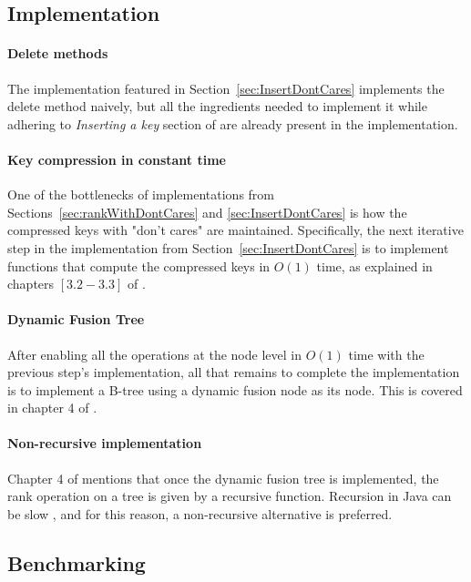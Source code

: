 \subsection{Implementation} \label{sec:FutureWorkImplementation}

\paragraph*{Delete methods}
The implementation featured in Section~\ref{sec:InsertDontCares} implements the {\ttfamily delete} method naively, but all the ingredients needed to implement it while adhering to \textit{Inserting a key} section of \cite{patrascu2014dynamic} are already present in the implementation.

\paragraph*{Key compression in constant time}
One of the bottlenecks of implementations from Sections~\ref{sec:rankWithDontCares} and \ref{sec:InsertDontCares} is how the compressed keys with "don't cares" are maintained. Specifically, the next iterative step in the implementation from Section~\ref{sec:InsertDontCares} is to implement functions that compute the compressed keys in $O(1)$ time, as explained in chapters $[3.2 - 3.3]$ of \cite{patrascu2014dynamic}.

\paragraph*{Dynamic Fusion Tree}
After enabling all the operations at the node level in $O(1)$ time with the previous step's implementation, all that remains to complete the implementation is to implement a B-tree using a dynamic fusion node as its node. This is covered in chapter 4 of \cite{patrascu2014dynamic}.

\paragraph*{Non-recursive implementation}
Chapter 4 of \cite{patrascu2014dynamic} mentions that once the dynamic fusion tree is implemented, the rank operation on a tree is given by a recursive function. Recursion in Java can be slow \cite{shirazi2003java}, and for this reason, a non-recursive alternative is preferred.


\subsection{Benchmarking}

